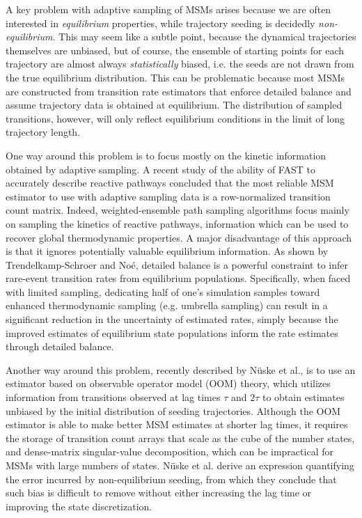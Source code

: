 \documentclass[%
 aip,
rsi,%
 amsmath,amssymb,
 reprint,%
]{revtex4-1}
\begin{document}
A key problem with adaptive sampling of MSMs arises because we are often interested in \textit{equilibrium} properties, while trajectory seeding is decidedly \textit{non-equilibrium}.  This may seem like a subtle point, because the dynamical trajectories themselves are unbiased, but of course, the ensemble of starting points for each trajectory are almost always \textit{statistically} biased, i.e. the seeds are not drawn from the true equilibrium distribution.  This can be problematic because most MSMs are constructed from transition rate estimators that enforce detailed balance and assume trajectory data is obtained at equilibrium. The distribution of sampled transitions, however, will only reflect equilibrium conditions in the limit of long trajectory length.

One way around this problem is to focus mostly on the kinetic information obtained by adaptive sampling.  A recent study of the ability of FAST to accurately describe reactive pathways concluded that the most reliable MSM estimator to use with adaptive sampling data is a row-normalized transition count matrix.\cite{Zimmerman:2018jn} Indeed, weighted-ensemble path sampling algorithms focus mainly on sampling the kinetics of reactive pathways, information which can be used to recover global thermodynamic properties.\cite{BinWZhang:2010kf,Zwier:2015fn, Dickson:2016it, Lotz:2018hx, Dixon:2018fs} A major disadvantage of this approach is that it ignores potentially valuable equilibrium information.  As shown by Trendelkamp-Schroer and No{\'e},\cite{trendelkamp2016efficient} detailed balance is a powerful constraint to infer rare-event transition rates from equilibrium populations.  Specifically, when faced with limited sampling, dedicating half of one's simulation samples toward enhanced thermodynamic sampling (e.g. umbrella sampling) can result in a significant reduction in the uncertainty of estimated rates, simply because the improved estimates of equilibrium state populations inform the rate estimates through detailed balance.

Another way around this problem, recently described by N{\"u}ske et al., is to use an estimator based on observable operator model (OOM) theory, which utilizes information from transitions observed at lag times $\tau$ and $2\tau$ to obtain estimates unbiased by the initial distribution of seeding trajectories.\cite{Nuske:2017ex}  Although the OOM estimator is able to make better MSM estimates at shorter lag times, it requires the storage of transition count arrays that scale as the cube of the number states, and dense-matrix singular-value decomposition, which can be impractical for MSMs with large numbers of states.  N{\"u}ske et al. derive an expression quantifying the error incurred by non-equilibrium seeding, from which they conclude that such bias is difficult to remove without either increasing the lag time or improving the state discretization.  
\end{document}
